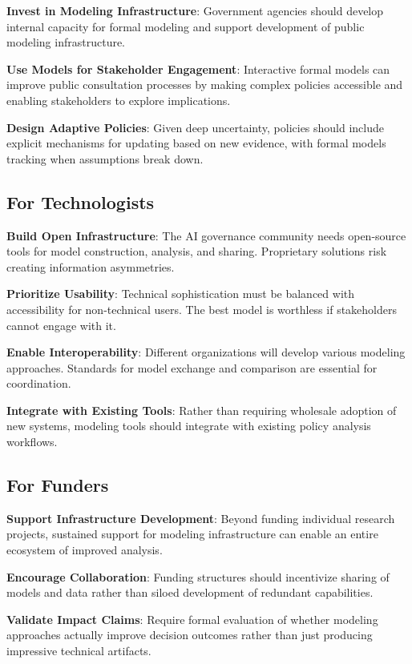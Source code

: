 \documentclass[
  11pt,
  letterpaper,
]{book}
\begin{document}
\textbf{Invest in Modeling Infrastructure}: Government agencies should
develop internal capacity for formal modeling and support development of
public modeling infrastructure.

\textbf{Use Models for Stakeholder Engagement}: Interactive formal
models can improve public consultation processes by making complex
policies accessible and enabling stakeholders to explore implications.

\textbf{Design Adaptive Policies}: Given deep uncertainty, policies
should include explicit mechanisms for updating based on new evidence,
with formal models tracking when assumptions break down.

\subsection{For Technologists}\label{sec-technologist-recommendations}

\textbf{Build Open Infrastructure}: The AI governance community needs
open-source tools for model construction, analysis, and sharing.
Proprietary solutions risk creating information asymmetries.

\textbf{Prioritize Usability}: Technical sophistication must be balanced
with accessibility for non-technical users. The best model is worthless
if stakeholders cannot engage with it.

\textbf{Enable Interoperability}: Different organizations will develop
various modeling approaches. Standards for model exchange and comparison
are essential for coordination.

\textbf{Integrate with Existing Tools}: Rather than requiring wholesale
adoption of new systems, modeling tools should integrate with existing
policy analysis workflows.

\subsection{For Funders}\label{sec-funder-recommendations}

\textbf{Support Infrastructure Development}: Beyond funding individual
research projects, sustained support for modeling infrastructure can
enable an entire ecosystem of improved analysis.

\textbf{Encourage Collaboration}: Funding structures should incentivize
sharing of models and data rather than siloed development of redundant
capabilities.

\textbf{Validate Impact Claims}: Require formal evaluation of whether
modeling approaches actually improve decision outcomes rather than just
producing impressive technical artifacts.
\end{document}
